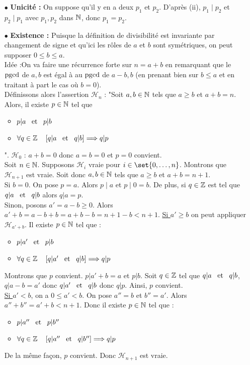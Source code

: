 \documentclass{magnolia}
\begin{document}
\begin{preuve}
\begin{itemize}
\item[$\bullet$] \textbf{Unicité :} On suppose qu'il y en a deux $p_1$ et $p_2$. D'après (ii), $p_1 \mid p_2$ et $p_2\mid p_1$ avec $p_1, p_2$ dans $\mathbb{N}$, donc $p_1=p_2$.
\item[$\bullet$] \textbf{Existence :} Puisque la définition de divisibilité est invariante par changement de signe et qu'ici les rôles de $a$ et $b$ sont symétriques, on peut supposer $0\leq b\leq a$.\\
Idée :On va faire une récurrence forte sur $n=a+b$ en remarquant que le $\operatorname{pgcd}$ de $a,b$ est
égal à au $\operatorname{pgcd}$ de $a-b,b$ (en prenant bien sur $b\leq a$ et en traitant
à part le cas où $b=0$).\\
Définissons alors l'assertion $\mathcal{H}_n$ : "Soit $a,b\in \mathbb{N}$ tels que $a\geq b$ et $a+b=n$. Alors, il existe $p\in\mathbb{N}$ tel que \begin{itemize}
\item $p|a \quad\!\text{et}\quad\! p|b$
\item $\forall q\in\mathbb{Z} \quad \left[q|a \quad\!\text{et}\quad\! q|b\right] \Longrightarrow q|p$
\end{itemize}".
$\mathcal{H}_0$ : $a+b=0$ donc $a=b=0$ et $p=0$ convient.\\
Soit $n\in \mathbb{N}$. Supposons $\mathcal{H}_i$ vraie pour $i\in \set{0,\ldots,n}$. Montrons que $\mathcal{H}_{n+1}$ est vraie. Soit donc $a,b\in \mathbb{N}$ tels que $a\geq b$ et $a+b=n+1$.\\
Si $b=0$. On pose $p=a$. Alors $p\mid a$ et $p\mid 0=b$. De plus, si $q\in \mathbb{Z}$ est tel que $q|a \quad\!\text{et}\quad\! q|b$ alors $q|a=p$.\\
Sinon, posons $a'=a-b\geq 0$. Alors $a'+b=a-b+b=a+b-b=n+1-b<n+1$. \underline{Si $a'\geq b$} on peut appliquer $\mathcal{H}_{a'+b}$. Il existe $p\in\mathbb{N}$ tel que :
\begin{itemize}
\item $p|a' \quad\!\text{et}\quad\! p|b$
\item $\forall q\in\mathbb{Z} \quad \left[q|a' \quad\!\text{et}\quad\! q|b\right] \Longrightarrow q|p$
\end{itemize}
Montrons que $p$ convient. $p|a'+b=a$ et $p|b$. Soit $q\in \mathbb{Z}$ tel que $q|a \quad\!\text{et}\quad\! q|b$, $q|a-b=a'$ donc $q|a' \quad\!\text{et}\quad\! q|b$ donc $q|p$. Ainsi, $p$ convient.\\
\underline{Si $a'<b$}, on a $0\leq a'<b$. On pose $a''=b$ et $b''=a'$. Alors $a''+b''=a'+b<n+1$. Donc il existe $p\in \mathbb{N}$ tel que :
\begin{itemize}
\item $p|a'' \quad\!\text{et}\quad\! p|b''$
\item $\forall q\in\mathbb{Z} \quad \left[q|a'' \quad\!\text{et}\quad\! q|b''\right] \Longrightarrow q|p$
\end{itemize}
De la même façon, $p$ convient.
Donc $\mathcal{H}_{n+1}$ est vraie.
\end{itemize}
 
\end{preuve}
\end{document}
